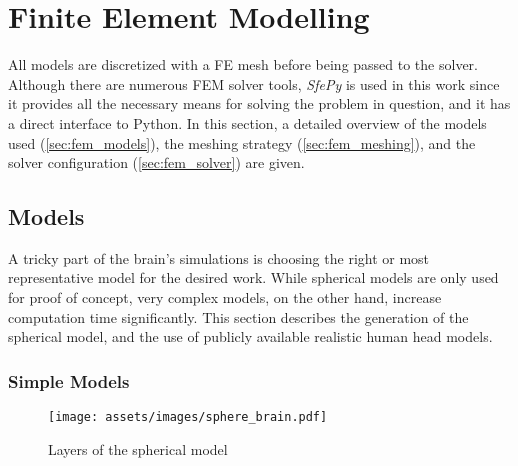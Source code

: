 \pagebreak
\chapter{Finite Element Modelling}

All models are discretized with a \gls{FE} mesh before being passed to the solver. Although there are numerous \gls{FEM} solver tools, \textit{SfePy} is used in this work \cite{Cimrman2019} since it provides all the necessary means for solving the problem in question, and it has a direct interface to Python. In this section, a detailed overview of the models used (\autoref{sec:fem_models}), the meshing strategy (\autoref{sec:fem_meshing}), and the solver configuration (\autoref{sec:fem_solver}) are given.

\section{Models}
\label{sec:fem_models}

A tricky part of the brain's simulations is choosing the right or most representative model for the desired work. While spherical models are only used for proof of concept, very complex models, on the other hand, increase computation time significantly. This section describes the generation of the spherical model, and the use of publicly available realistic human head models.

\subsection{Simple Models}
\begin{wrapfigure}{r}{0.35\textwidth}
    \centering
    \texttt{[image: assets/images/sphere\_brain.pdf]}
    \caption{Layers of the spherical model}
    \vspace{-4cm}
    \label{fig:sphere_brain}
\end{wrapfigure}

